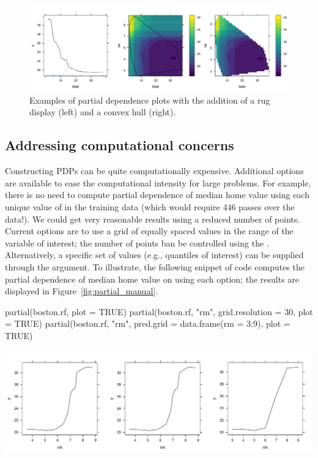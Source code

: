\begin{figure}[htbp]
  \centering
  \includegraphics[width=1.0\linewidth]{partial_extrap}
  \caption{Examples of partial dependence plots with the addition of a rug display (left) and a convex hull (right).}
  \label{fig:partial_extrap}
\end{figure}

\subsection{Addressing computational concerns}

Constructing PDPs can be quite computationally expensive. Additional options are available to ease the computational intensity for large problems. For example, there is no need to compute partial dependence of median home value using each unique value of  in the training data (which would require 446 passes over the data!). We could get very reasonable results using a reduced number of points. Current options are to use a grid of equally spaced values in the range of the variable of interest; the number of points ban be controlled using the . Alternatively, a specific set of values (e.g., quantiles of interest) can be supplied through the  argument. To illustrate, the following snippet of code computes the partial dependence of median home value on  using each option; the results are displayed in Figure~\ref{fig:partial_manual}.
\begin{example}
partial(boston.rf, plot = TRUE)
partial(boston.rf, "rm", grid.resolution = 30, plot = TRUE)
partial(boston.rf, "rm", pred.grid = data.frame(rm = 3:9), plot = TRUE)
\end{example}

\begin{widefigure}[htbp]
  \centering
  \includegraphics[width=0.8\linewidth]{partial_manual}
  \caption{Partial dependence of  on . \textit{Left}: Default plot. \textit{Middle}: Using a reduced grid size. \textit{Right}: Using a user-specified grid.}
  \label{fig:partial_manual}
\end{widefigure}


